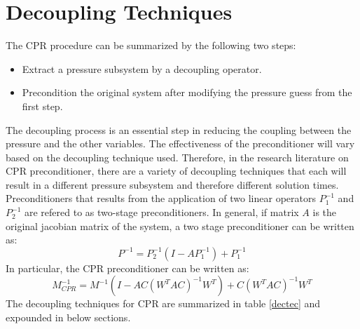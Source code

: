 \section{Decoupling Techniques}
The CPR procedure can be summarized by the following two steps:
\begin{itemize}
	\item Extract a pressure subsystem by a decoupling operator.
	\item Precondition the original system after modifying the pressure guess from the first step.
\end{itemize}
The decoupling process is an essential step in reducing the coupling between the pressure and the other variables.
The effectiveness of the preconditioner will vary based on the decoupling technique used. Therefore, in the research
literature on CPR preconditioner, there are a variety of decoupling techniques that each will result in a different pressure
subsystem and therefore different solution times. Preconditioners that results from the application of two linear operators
$P_{1}^{-1}$ and $P_{2}^{-1}$ are refered to as two-stage preconditioners. In general, if matrix $A$ is the original jacobian
matrix of the system, a two stage preconditioner can be written as:
\begin{equation}
	P^{-1} = P_{2}^{-1}(I-AP_{1}^{-1}) + P_{1}^{-1}
\end{equation}
In particular, the CPR preconditioner can be written as:
\begin{equation}
	M_{CPR}^{-1} = M^{-1}(I - AC(W^{T}AC)^{-1}W^{T}) + C(W^{T}AC)^{-1}W^{T}
\end{equation}
The decoupling techniques for CPR are summarized in table \ref{dectec} and expounded in below sections.

